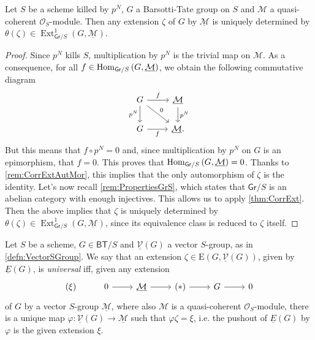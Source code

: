 \begin{lem}\label{lem:rigidityExt}
	Let $S$ be a scheme killed by $p^N$, $G$ a Barsotti-Tate group on $S$
	and $\mathcal{M}$ a quasi-coherent $\mathcal{O}_S$-module.
	Then any extension $\zeta$ of $G$ by $\underline{\mathcal{M}}$ is
	uniquely determined by $\theta(\zeta) \in 
	\operatorname{Ext}^1_{\mathsf{Gr}/S}(G, \underline{\mathcal{M}})$.
\end{lem} 
\begin{proof}
	Since $p^N$ kills $S$, multiplication by $p^N$ 
	is the trivial map on $\mathcal{M}$.
	As a consequence, for all $f \in \operatorname{Hom}_{\mathsf{Gr}/S}
	\left( G, \underline{\mathcal{M}} \right)$,
	we obtain the following commutative diagram
	\begin{equation*}
	\begin{tikzcd}
		G \arrow[r, "f", rightarrow] 
		\arrow[d, "p^N"', rightarrow] 
		\arrow[rd, "0", rightarrow] &
		\underline{\mathcal{M}} \arrow[d, "p^N", rightarrow] \\
		G \arrow[r, "f"', rightarrow] &
		\underline{\mathcal{M}}
	.\end{tikzcd}
	\end{equation*}
	But this means that $f \circ p^N = 0$ and, since multiplication
	by $p^N$ on $G$ is an epimorphism, that $f = 0$.
	This proves that $\operatorname{Hom}_{ \mathsf{Gr}/S } \left( G, \underline{\mathcal{M}} \right) = 0$.
	Thanks to \cref{rem:CorrExtAutMor}, this implies that
	the only automorphism of $\zeta$ is the identity.
	Let's now recall \cref{rem:PropertiesGrS},
	which states that $\mathsf{Gr}/S$ is an abelian category with enough injectives.
	This allows us to apply \cref{thm:CorrExt}.
	Then the above implies that $\zeta$ is uniquely determined by $\theta(\zeta)
	\in \operatorname{Ext}^1_{\mathsf{Gr}/S}(G, \underline{\mathcal{M}})$,
	since its equivalence class is reduced to $\zeta$ itself.
\end{proof}


\begin{defn}
	Let $S$ be a scheme, $G \in \mathsf{BT}/S$
	and $\underline{\mathcal{V}}(G)$ a vector $S$-group,
	as in \cref{defn:VectorSGroup}.
	We say that an extension $\zeta \in \mathrm{E}(G, \underline{\mathcal{V}}(G))$, given
	by $\underline{E}(G)$, is \emph{universal} iff, given any extension
	\begin{equation*}
	\begin{tikzcd}
		(\xi) &
		0 \arrow[r, "", rightarrow] &
		\underline{\mathcal{M}} \arrow[r, "", rightarrow] &
		(*) \arrow[r, "", rightarrow] &
		G \arrow[r, "", rightarrow] &
		0
	\end{tikzcd}
	\end{equation*}
	of $G$ by a vector $S$-group $\underline{\mathcal{M}}$,
	where also $\mathcal{M}$ is a quasi-coherent $\mathcal{O}_{ S }$-module,
	there is a unique map $\varphi\colon \underline{\mathcal{V}}(G) \to \underline{\mathcal{M}}$
	such that $\varphi\zeta = \xi$, i.e. the pushout of
	$\underline{E}(G)$ by $\varphi$ is the given extension $\xi$.
\end{defn}


